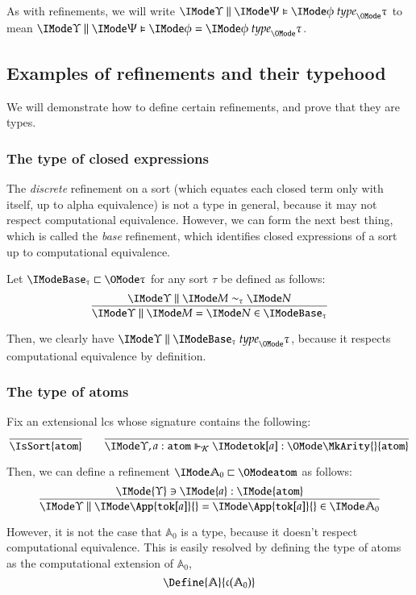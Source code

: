 \documentclass[11pt]{article}
\theoremstyle{definition}
\theoremstyle{notation}
\theoremstyle{remark}
\numberwithin{equation}{section}
\newcommand\TyBase[1]{\mathtt{Base}_{#1}}
\begin{document}
As with refinements, we will write $\IsTypeFam{\Upsilon}{\Psi}{\phi}{\tau}$
to mean $\EqTypeFam{\Upsilon}{\Psi}{\phi}{\phi}{\tau}$.

\subsection{Examples of refinements and their typehood}

We will demonstrate how to define certain refinements, and prove that they are
types.

\subsubsection{The type of closed expressions}

The \emph{discrete} refinement on a sort (which equates each closed term only
with itself, up to alpha equivalence) is not a type in general, because it may
not respect computational equivalence. However, we can form the next best
thing, which is called the \emph{base} refinement, which identifies closed
expressions of a sort up to computational equivalence.

Let $\GloballyRefines{\TyBase{\tau}}{\tau}$ for any sort $\tau$ be defined as
follows:
\[
  \infer{
    \RMemEq{\Upsilon}{M}{N}{\TyBase{\tau}}
  }{
    \PBinRel{\sim_\tau}{\Upsilon}{M}{N}
  }
\]

Then, we clearly have $\IsType{\Upsilon}{\TyBase{\tau}}{\tau}$, because it respects
computational equivalence by definition.

\subsubsection{The type of atoms}
\label{sec:atom-type}
\newcommand\SortAtom{\mathtt{atom}}
\newcommand\OpToken[1]{\mathtt{tok}[#1]}
\newcommand\OpMatch[1]{\mathtt{match}_{#1}}
\newcommand\Atoms{\mathbb{A}}

Fix an extensional lcs whose signature contains the following:
\[
  \infer{
    \IsSort{\SortAtom}
  }{
  }
  \qquad
  \infer{
    \IsCanOperator{\Upsilon,a:\SortAtom}{
      \OpToken{a}
    }{
      \MkArity{}{\SortAtom}
    }
  }{
  }
\]

Then, we can define a refinement $\GloballyRefines{\Atoms_0}{\SortAtom}$ as
follows:
\[
  \infer{
    \RMemEq{\Upsilon}{
      \App{\OpToken{a}}{}
    }{
      \App{\OpToken{a}}{}
    }{\Atoms_0}
  }{
    \IMode{\Upsilon}\ni\IMode{a}:\IMode{\SortAtom}
  }
\]

However, it is not the case that $\Atoms_0$ is a type, because it doesn't
respect computational equivalence. This is easily resolved by defining the type
of atoms as the computational extension of $\Atoms_0$,
\[
  \Define{
    \Atoms
  }{
    \VToCType(\Atoms_0)
  }
\]
\end{document}
